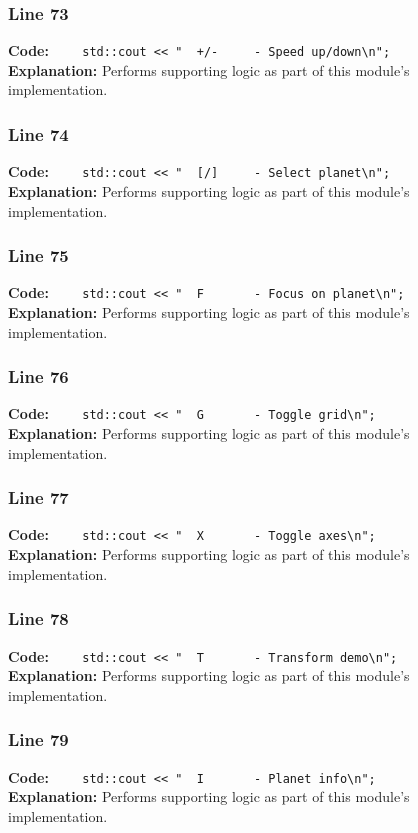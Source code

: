 \documentclass[11pt,a4paper]{article}
\begin{document}
\subsubsection*{Line 73}
\textbf{Code:} \verb|    std::cout << "  +/-     - Speed up/down\n";|\\
\textbf{Explanation:} Performs supporting logic as part of this module's implementation.

\subsubsection*{Line 74}
\textbf{Code:} \verb|    std::cout << "  [/]     - Select planet\n";|\\
\textbf{Explanation:} Performs supporting logic as part of this module's implementation.

\subsubsection*{Line 75}
\textbf{Code:} \verb|    std::cout << "  F       - Focus on planet\n";|\\
\textbf{Explanation:} Performs supporting logic as part of this module's implementation.

\subsubsection*{Line 76}
\textbf{Code:} \verb|    std::cout << "  G       - Toggle grid\n";|\\
\textbf{Explanation:} Performs supporting logic as part of this module's implementation.

\subsubsection*{Line 77}
\textbf{Code:} \verb|    std::cout << "  X       - Toggle axes\n";|\\
\textbf{Explanation:} Performs supporting logic as part of this module's implementation.

\subsubsection*{Line 78}
\textbf{Code:} \verb|    std::cout << "  T       - Transform demo\n";|\\
\textbf{Explanation:} Performs supporting logic as part of this module's implementation.

\subsubsection*{Line 79}
\textbf{Code:} \verb|    std::cout << "  I       - Planet info\n";|\\
\textbf{Explanation:} Performs supporting logic as part of this module's implementation.
\end{document}
